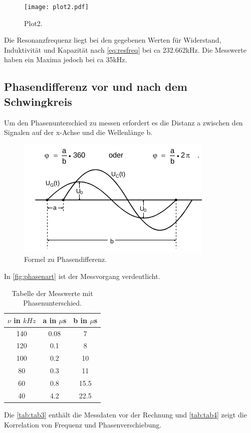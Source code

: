 \begin{figure}
  \centering
  \texttt{[image: plot2.pdf]}
  \caption{Plot2.}
  \label{fig:plot2}
\end{figure}
Die Resonanzfrequenz liegt bei den gegebenen Werten für Widerstand, Induktivität und Kapazität nach \autoref{eq:resfreq} bei ca 232.662kHz.
Die Messwerte haben ein Maxima jedoch bei ca 35kHz.
\newpage
\subsection{Phasendifferenz vor und nach dem Schwingkreis}
Um den Phasenunterschied zu messen erfordert es die Distanz a zwischen den Signalen auf der x-Achse und die Wellenlänge b.\\

\begin{figure}[htb]
  \centering
  \caption{Formel zu Phasendifferenz.}
  \label{fig:phasenart}
  \includegraphics[scale = 0.5]{content/Phasendar.png}
\end{figure}

In \autoref{fig:phasenart} ist der Messvorgang verdeutlicht.\\

\begin{table}[htb]
  \centering
  \caption{Tabelle der Messwerte mit Phasenunterschied.}
  \label{tab:tab3}
  \begin{tabular}{c c c}
    \toprule
    $\nu$ in $kHz$ & a in $\mu$s & b in $\mu$s\\
    \midrule
    140 & 0.08 & 7\\
    120 & 0.1 & 8\\
    100 & 0.2 & 10\\
    80 & 0.3 & 11\\
    60 & 0.8 & 15.5\\
    40 & 4.2 & 22.5\\
    \bottomrule
  \end{tabular}
\end{table}
\newpage
Die \autoref{tab:tab3} enthält die Messdaten vor der Rechnung und \autoref{tab:tab4} zeigt die Korrelation von Frequenz und Phasenverschiebung.\\

